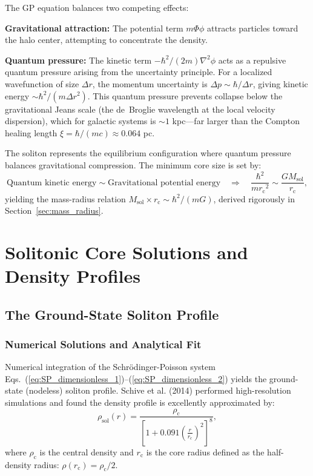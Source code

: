 \documentclass[11pt,a4paper]{article}
\newcommand{\Msol}{\ensuremath{M_{\mathrm{sol}}}}
\newcommand{\rc}{\ensuremath{r_{\mathrm{c}}}}
\newcommand{\rhoc}{\ensuremath{\rho_{\mathrm{c}}}}
\theoremstyle{definition}
\theoremstyle{remark}
\begin{document}
The GP equation balances two competing effects:

\textbf{Gravitational attraction:} The potential term $m\Phi\phi$ attracts particles toward the halo center, attempting to concentrate the density.

\textbf{Quantum pressure:} The kinetic term $-\hbar^2/(2m)\nabla^2\phi$ acts as a repulsive quantum pressure arising from the uncertainty principle. For a localized wavefunction of size $\Delta r$, the momentum uncertainty is $\Delta p \sim \hbar/\Delta r$, giving kinetic energy $\sim \hbar^2/(m \Delta r^2)$. This quantum pressure prevents collapse below the gravitational Jeans scale (the de~Broglie wavelength at the local velocity dispersion), which for galactic systems is $\sim 1$ kpc---far larger than the Compton healing length $\xi = \hbar/(mc) \approx 0.064$ pc.

The soliton represents the equilibrium configuration where quantum pressure balances gravitational compression. The minimum core size is set by:
\begin{equation}
\text{Quantum kinetic energy} \sim \text{Gravitational potential energy} \quad \Rightarrow \quad \frac{\hbar^2}{m\rc^2} \sim \frac{G\Msol}{\rc},
\end{equation}
yielding the mass-radius relation $\Msol \times \rc \sim \hbar^2/(mG)$, derived rigorously in Section~\ref{sec:mass_radius}.

\section{Solitonic Core Solutions and Density Profiles}
\label{sec:solitonic_cores}

\subsection{The Ground-State Soliton Profile}
\label{sec:soliton_profile}

\subsubsection{Numerical Solutions and Analytical Fit}

Numerical integration of the Schr\"odinger-Poisson system Eqs.~(\ref{eq:SP_dimensionless_1})--(\ref{eq:SP_dimensionless_2}) yields the ground-state (nodeless) soliton profile. Schive et al. (2014) \cite{Schive2014a} performed high-resolution simulations and found the density profile is excellently approximated by:
\begin{equation}
\label{eq:soliton_profile}
\boxed{\rho_{\mathrm{sol}}(r) = \frac{\rhoc}{\left[1 + 0.091\left(\frac{r}{\rc}\right)^2\right]^8},}
\end{equation}
where $\rhoc$ is the central density and $\rc$ is the core radius defined as the half-density radius: $\rho(\rc) = \rhoc/2$.
\end{document}
